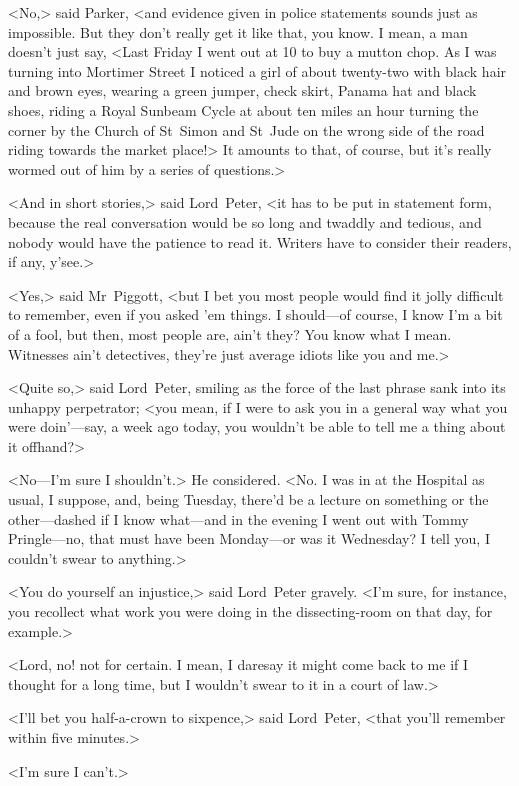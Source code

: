 <No,> said Parker, <and evidence given in police statements sounds just as impossible. But they don't really get it like that, you know. I mean, a man doesn't just say, <Last Friday I went out at 10  to buy a mutton chop. As I was turning into Mortimer Street I noticed a girl of about twenty-two with black hair and brown eyes, wearing a green jumper, check skirt, Panama hat and black shoes, riding a Royal Sunbeam Cycle at about ten miles an hour turning the corner by the Church of St~Simon and St~Jude on the wrong side of the road riding towards the market place!> It amounts to that, of course, but it's really wormed out of him by a series of questions.>

<And in short stories,> said Lord~Peter, <it has to be put in statement form, because the real conversation would be so long and twaddly and tedious, and nobody would have the patience to read it. Writers have to consider their readers, if any, y'see.>

<Yes,> said Mr~Piggott, <but I bet you most people would find it jolly difficult to remember, even if you asked 'em things. I should—of course, I know I'm a bit of a fool, but then, most people are, ain't they? You know what I mean. Witnesses ain't detectives, they're just average idiots like you and me.>

<Quite so,> said Lord~Peter, smiling as the force of the last phrase sank into its unhappy perpetrator; <you mean, if I were to ask you in a general way what you were doin'—say, a week ago today, you wouldn't be able to tell me a thing about it offhand?>

<No—I'm sure I shouldn't.> He considered. <No. I was in at the Hospital as usual, I suppose, and, being Tuesday, there'd be a lecture on something or the other—dashed if I know what—and in the evening I went out with Tommy Pringle—no, that must have been Monday—or was it Wednesday? I tell you, I couldn't swear to anything.>

<You do yourself an injustice,> said Lord~Peter gravely. <I'm sure, for instance, you recollect what work you were doing in the dissecting-room on that day, for example.>

<Lord, no! not for certain. I mean, I daresay it might come back to me if I thought for a long time, but I wouldn't swear to it in a court of law.>

<I'll bet you half-a-crown to sixpence,> said Lord~Peter, <that you'll remember within five minutes.>

<I'm sure I can't.>

